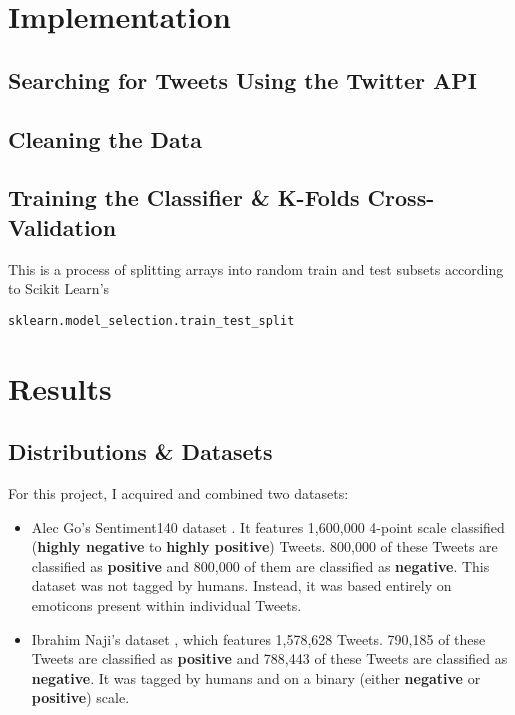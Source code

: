 \documentclass[11pt, twoside, reqno]{book}
\begin{document}
\chapter{Implementation}
\label{implementation}

\section{Searching for Tweets Using the Twitter API}
\label{searching_with_api}

\section{Cleaning the Data}
\label{cleaning_data}

\section{Training the Classifier \& K-Folds Cross-Validation}
\label{training_and_k_folds}

This is a process of splitting arrays into random train and test subsets according to Scikit Learn's \begin{verbatim}sklearn.model_selection.train_test_split\end{verbatim}

\chapter{Results}
\label{results}

\section{Distributions \& Datasets}
\label{distributions_and_datasets}

For this project, I acquired and combined two datasets: 

\begin{itemize}

\item Alec Go's Sentiment140 dataset \cite{GODATASET}. It features 1,600,000 4-point scale classified (\textbf{highly negative} to \textbf{highly positive}) Tweets. 800,000 of these Tweets are classified as \textbf{positive} and 800,000 of them are classified as \textbf{negative}. This dataset was not tagged by humans. Instead, it was based entirely on emoticons present within individual Tweets. 

\item Ibrahim Naji's dataset \cite{NAJIDATASET}, which features 1,578,628 Tweets. 790,185 of these Tweets are classified as \textbf{positive} and 788,443 of these Tweets are classified as \textbf{negative}. It was tagged by humans and on a binary (either \textbf{negative} or \textbf{positive}) scale.

\end{itemize}
\end{document}
